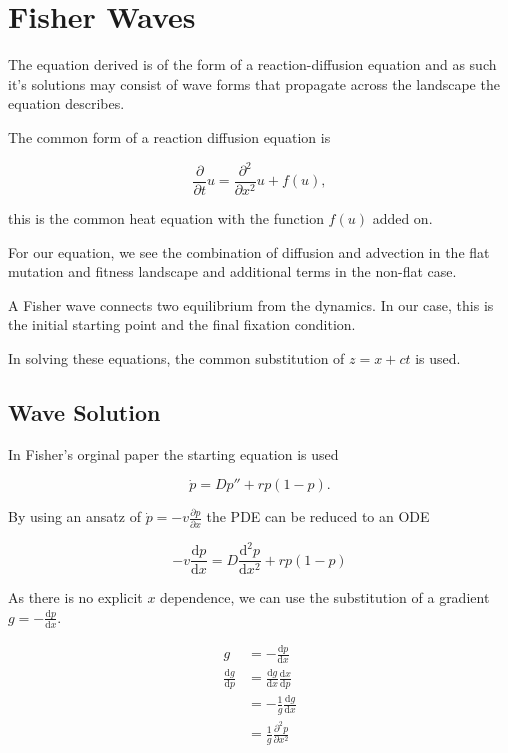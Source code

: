 \documentclass[11pt, a4paper]{article}
\begin{document}
\section{Fisher Waves}

The equation derived is of the form of a reaction-diffusion equation and as such it's solutions may consist of wave forms that propagate across the landscape the equation describes.

The common form of a  reaction diffusion equation is 

\begin{equation}
\frac{\partial}{\partial t} u = \frac{\partial ^2}{\partial x ^2} u + f(u) ,
\end{equation}

this is the common heat equation with the function $f(u)$ added on. 

For our equation, we see the combination of diffusion and advection in the flat mutation and fitness landscape and additional terms in the non-flat case. 

A Fisher wave connects two equilibrium from the dynamics. In our case, this is the initial starting point  and the final fixation condition. 

In solving these equations, the common substitution of $z = x + ct$ is used. 

\subsection{Wave Solution}

In Fisher's orginal paper the starting equation is used

\begin{equation}
\dot{p} = Dp'' + rp(1-p). 
\end{equation}

By using an ansatz of $\dot{p} = - v \frac{\partial p }{\partial x} $ the PDE can be reduced to an ODE

\begin{equation}
- v \frac{\mathrm{d}p}{\mathrm{d} x}  = D \frac{\mathrm{d} ^2 p}{\mathrm{d} x ^2} + rp(1-p)
\end{equation}

As there is no explicit $x$ dependence, we can use the substitution of a gradient $g = - \frac{\mathrm{d} p}{\mathrm{d} x}$.

\begin{align*}
g & = - \frac{\mathrm{d} p}{\mathrm{d} x} \\
\frac{\mathrm{d} g}{\mathrm{d} p} & = \frac{\mathrm{d} g}{\mathrm{d} x} \frac{\mathrm{d} x}{\mathrm{d} p} \\
& = - \frac{1}{g} \frac{\mathrm{d} g}{\mathrm{d} x} \\
& = \frac{1}{g} \frac{\partial^2 p}{\partial x^2}
\end{align*}
\end{document}
